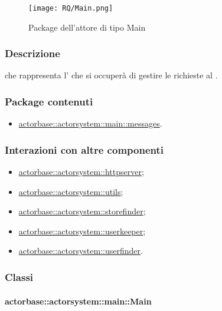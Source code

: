 \documentclass{scalatekids-article}
\begin{document}
\begin{figure}[H]
  \begin{center}
    \texttt{[image: RQ/Main.png]}
    \caption{Package dell'attore di tipo Main}
  \end{center}
\end{figure}

\subsubsection{Descrizione}
 che rappresenta l' che si occuperà di gestire le
richieste al .

\subsubsection{Package contenuti}
\begin{itemize}
\item \hyperref[sec:actorbase::actorsystem::main::messages]{actorbase::actorsystem::main::messages}.
\end{itemize}

\subsubsection{Interazioni con altre componenti}
\begin{itemize}
\item \hyperref[sec:actorbase::actorsystem::httpserver]{actorbase::actorsystem::httpserver};
\item \hyperref[sec:actorbase::actorsystem::utils]{actorbase::actorsystem::utils};
\item \hyperref[sec:actorbase::actorsystem::storefinder]{actorbase::actorsystem::storefinder};
\item \hyperref[sec:actorbase::actorsystem::userkeeper]{actorbase::actorsystem::userkeeper};
\item \hyperref[sec:actorbase::actorsystem::userfinder]{actorbase::actorsystem::userfinder}.
\end{itemize}

\subsubsection{Classi}

\paragraph{actorbase::actorsystem::main::Main}
\label{sec:actorbase::actorsystem::main::Main}
\end{document}
